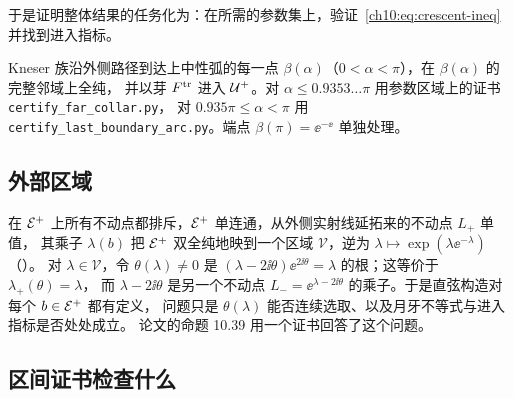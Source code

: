 于是证明整体结果的任务化为：在所需的参数集上，验证~\eqref{ch10:eq:crescent-ineq} 并找到进入指标。

\begin{theorem}\label{ch10:thm:far-arc}
Kneser 族沿外侧路径到达上中性弧的每一点 $\beta(\alpha)$（$0<\alpha<\pi$），在 $\beta(\alpha)$ 的完整邻域上全纯，
并以芽 $F^{\mathrm{tr}}$ 进入 $\mathcal U^{+}$。对 $\alpha\le0.9353\ldots\pi$ 用参数区域上的证书 \texttt{certify\_far\_collar.py}，
对 $0.935\pi\le\alpha<\pi$ 用 \texttt{certify\_last\_boundary\_arc.py}。端点 $\beta(\pi)=\ee^{-\ee}$ 单独处理。
\end{theorem}

\subsection{外部区域}

在 $\mathcal E^{+}$ 上所有不动点都排斥，$\mathcal E^{+}$ 单连通，从外侧实射线延拓来的不动点 $L_+$ 单值，
其乘子 $\lambda(b)$ 把 $\mathcal E^{+}$ 双全纯地映到一个区域 $\mathcal V$，逆为 $\lambda\mapsto\exp(\lambda\ee^{-\lambda})$（\cite[引理~10.37]{KneserPaper}）。
对 $\lambda\in\mathcal V$，令 $\theta(\lambda)\neq0$ 是 $(\lambda-2\ii\theta)\ee^{2\ii\theta}=\lambda$ 的根；这等价于 $\lambda_+(\theta)=\lambda$，
而 $\lambda-2\ii\theta$ 是另一个不动点 $L_-=\ee^{\lambda-2\ii\theta}$ 的乘子。于是直弦构造对每个 $b\in\mathcal E^{+}$ 都有定义，
问题只是 $\theta(\lambda)$ 能否连续选取、以及月牙不等式与进入指标是否处处成立。
论文的命题 10.39 用一个证书回答了这个问题。

\subsection{区间证书检查什么}\label{ch10:sec:certificates}

